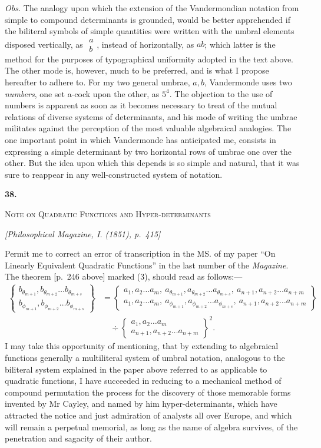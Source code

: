 \documentclass[11pt]{article}
\newcommand{\paperhead}[3]{%
  \clearpage
  \begin{center}
  {\Large\bfseries #1.}\par\vspace{0.85em}
  {\large\scshape #2}\par\vspace{0.6em}
  {\itshape [#3]}\par
  \end{center}\vspace{0.4em}}
\newcommand{\sourcepage}[1]{\marginpar{\scriptsize p.~#1}}
\newcommand{\bd}[2]{\left\{\begin{matrix}#1\\#2\end{matrix}\right\}}
\begin{document}
{{\sourcepage{250}
\emph{Obs.} The analogy upon which the extension of the Vandermondian notation from simple to compound determinants is grounded, would be better apprehended if the biliteral symbols of simple quantities were written with the umbral elements disposed vertically, as $\begin{smallmatrix}a\\b\end{smallmatrix}$, instead of horizontally, as $ab$; which latter is the method for the purposes of typographical uniformity adopted in the text above. The other mode is, however, much to be preferred, and is what I propose hereafter to adhere to. For my two general umbrae, $a,b$, Vandermonde uses two \emph{numbers}, one set a-cock upon the other, as $5^4$. The objection to the use of numbers is apparent as soon as it becomes necessary to treat of the mutual relations of diverse systems of determinants, and his mode of writing the umbrae militates against the perception of the most valuable algebraical analogies. The one important point in which Vandermonde has anticipated me, consists in expressing a simple determinant by two horizontal rows of umbrae one over the other. But the idea upon which this depends is so simple and natural, that it was sure to reappear in any well-constructed system of notation.

\paperhead{38}{Note on Quadratic Functions and Hyper-determinants}{Philosophical Magazine, I. (1851), p.~415}

\sourcepage{251}
Permit me to correct an error of transcription in the MS. of my paper ``On Linearly Equivalent Quadratic Functions'' in the last number of the \emph{Magazine}. The theorem [p.~246 above] marked (3), should read as follows:---
\[
\begin{aligned}
\bd{b_{\theta_{m+1}},b_{\theta_{m+2}}\ldots b_{\theta_{m+s}}}{b_{\phi_{m+1}},b_{\phi_{m+2}}\ldots b_{\phi_{m+s}}}
&=
\bd{a_1,a_2\ldots a_m,\ a_{\theta_{m+1}},a_{\theta_{m+2}}\ldots a_{\theta_{m+s}},\ a_{n+1},a_{n+2}\ldots a_{n+m}}{a_1,a_2\ldots a_m,\ a_{\phi_{m+1}},a_{\phi_{m+2}}\ldots a_{\phi_{m+s}},\ a_{n+1},a_{n+2}\ldots a_{n+m}}\\
&\quad\div
\bd{a_1,a_2\ldots a_m}{a_{n+1},a_{n+2}\ldots a_{n+m}}^2.
\end{aligned}
\]
I may take this opportunity of mentioning, that by extending to algebraical functions generally a multiliteral system of umbral notation, analogous to the biliteral system explained in the paper above referred to as applicable to quadratic functions, I have succeeded in reducing to a mechanical method of compound permutation the process for the discovery of those memorable forms invented by Mr Cayley, and named by him hyper-determinants, which have attracted the notice and just admiration of analysts all over Europe, and which will remain a perpetual memorial, as long as the name of algebra survives, of the penetration and sagacity of their author.

}}
\end{document}
